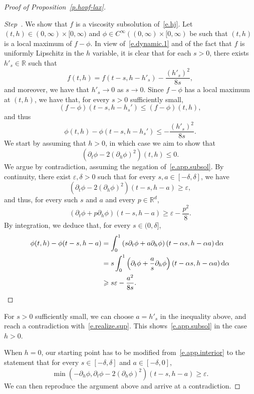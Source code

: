 \documentclass[AHL,Unicode,longabstracts,published]{cedram}
\newcommand{\R}{\mathbb{R}}
\newcommand{\Rd}{{\mathbb{R}^d}}
\renewcommand{\d}{\mathrm{d}}
\newcommand{\1}{\mathds{1}}
\newcommand{\ep}{\varepsilon}
\renewcommand{\le}{\leqslant}
\renewcommand{\ge}{\geqslant}
\newcommand{\de}{\delta}
\newcounter{stepcount}
\newenvironment{step}{\refstepcounter{stepcount}\begin{proof}[Step~\thestepcount]}{\let\qed\relax\end{proof}}
\begin{document}
\begin{proof}[Proof of Proposition~\ref{p.hopf-lax}]
\label{proofprop4.3Step5}
\begin{step}
We show that $f$ is a viscosity subsolution of~\eqref{e.hj}. Let $(t,h) \in (0,\infty)\times [0,\infty)$ and $\phi \in C^\infty((0,\infty)\times [0,\infty)$ be such that $(t,h)$ is a local maximum of $f-\phi$. In view of~\eqref{e.dynamic.1} and of the fact that $f$ is uniformly Lipschitz in the $h$ variable, it is clear that for each $s > 0$, there exists $h'_s \in \R$ such that
\[
f(t,h) = f(t-s,h-h'_s) - \frac{(h'_s)^2}{8s},
\]
and moreover, we have that $h'_s \to 0$ as $s \to 0$. Since $f-\phi$ has a local maximum at $(t,h)$, we have that, for every $s > 0$ sufficiently small,
\[
(f-\phi)(t-s,h-h_s') \le (f-\phi)(t,h),
\]
and thus
\begin{equation}\label{e.realize.sup}
\phi(t,h) - \phi(t-s,h-h_s') \le - \frac{(h'_s)^2}{8s}.
\end{equation}
We start by assuming that $h > 0$, in which case we aim to show that
\begin{equation}\label{e.app.subsol}
\left(\partial_t \phi - 2 (\partial_h \phi)^2 \right) (t,h) \le 0.
\end{equation}
We argue by contradiction, assuming the negation of~\eqref{e.app.subsol}. By continuity, there exist $\ep, \de > 0$ such that for every $s, a \in [-\de,\de]$, we have
\begin{equation}\label{e.app.interior}
\left(\partial_t \phi - 2 (\partial_h \phi)^2 \right) (t-s,h-a) \ge \ep,
\end{equation}
and thus, for every such $s$ and $a$ and every $p \in \Rd$,
\[
\left(\partial_t \phi + p \partial_h \phi\right) (t-s,h-a) \ge \ep - \frac{p^2}{8}.
\]
By integration, we deduce that, for every $s \in (0,\de]$,
\begin{align*}
\notag
\phi(t,h) - \phi(t-s,h-a) & = \int_0^1 \left(s\partial_t \phi + a \partial_h \phi\right)(t-\alpha s, h - \alpha a) \, \d \alpha
\\
\notag & = s \int_0^1 \left(\partial_t \phi + \frac{a}{s} \partial_h \phi\right)(t-\alpha s, h - \alpha a) \, \d \alpha
\\
&
\ge s\ep - \frac{a^2}{8s}.
\end{align*}
\end{step}

For $s > 0$ sufficiently small, we can choose $a = h'_s$ in the inequality above, and reach a contradiction with~\eqref{e.realize.sup}. This shows~\eqref{e.app.subsol} in the case $h > 0$.


When $h = 0$, our starting point has to be modified from~\eqref{e.app.interior} to the statement that for every $s \in [-\de,\de]$ and $a \in [-\delta,0]$,
\[
\min \left(-\partial_h \phi, \partial_t \phi - 2 (\partial_h \phi)^2 \right)(t-s,h-a) \ge \ep.
\]
We can then reproduce the argument above and arrive at a contradiction.
\end{proof}
\end{document}
